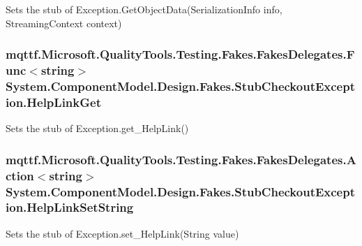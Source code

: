 Sets the stub of Exception.\-Get\-Object\-Data(\-Serialization\-Info info, Streaming\-Context context)

\hypertarget{class_system_1_1_component_model_1_1_design_1_1_fakes_1_1_stub_checkout_exception_a064809a673bb77b9c507efc93c2ad87e}{
\subsubsection[{Help\-Link\-Get}]{\setlength{\rightskip}{0pt plus 5cm}mqttf.\-Microsoft.\-Quality\-Tools.\-Testing.\-Fakes.\-Fakes\-Delegates.\-Func$<$string$>$ System.\-Component\-Model.\-Design.\-Fakes.\-Stub\-Checkout\-Exception.\-Help\-Link\-Get}}\label{class_system_1_1_component_model_1_1_design_1_1_fakes_1_1_stub_checkout_exception_a064809a673bb77b9c507efc93c2ad87e}


Sets the stub of Exception.\-get\-\_\-\-Help\-Link()

\hypertarget{class_system_1_1_component_model_1_1_design_1_1_fakes_1_1_stub_checkout_exception_ad3146086d0ebbbf4127a8e8d39b073d5}{
\subsubsection[{Help\-Link\-Set\-String}]{\setlength{\rightskip}{0pt plus 5cm}mqttf.\-Microsoft.\-Quality\-Tools.\-Testing.\-Fakes.\-Fakes\-Delegates.\-Action$<$string$>$ System.\-Component\-Model.\-Design.\-Fakes.\-Stub\-Checkout\-Exception.\-Help\-Link\-Set\-String}}\label{class_system_1_1_component_model_1_1_design_1_1_fakes_1_1_stub_checkout_exception_ad3146086d0ebbbf4127a8e8d39b073d5}


Sets the stub of Exception.\-set\-\_\-\-Help\-Link(\-String value)

